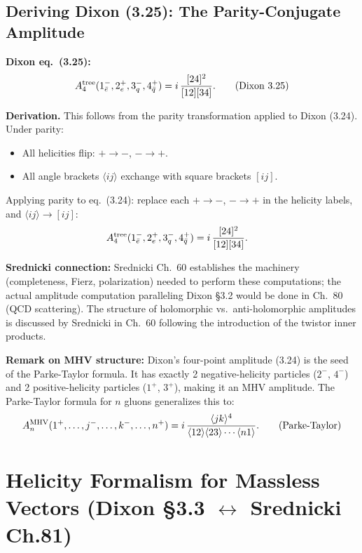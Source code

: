 \subsection{Deriving Dixon (3.25): The Parity-Conjugate Amplitude}

\textbf{Dixon eq.~(3.25):}
\begin{equation}
  A_4^{\rm tree}(1_{\bar{e}}^-, 2_e^+, 3_q^-, 4_{\bar{q}}^+)
  = i\,\frac{[24]^2}{[12][34]}.
  \tag{Dixon 3.25}
\end{equation}

\textbf{Derivation.} This follows from the parity transformation applied to Dixon (3.24).
Under parity:
\begin{itemize}
  \item All helicities flip: $+\to -$, $-\to +$.
  \item All angle brackets $\langle ij\rangle$ exchange with square brackets $[ij]$.
\end{itemize}

Applying parity to eq.~(3.24): replace each $+\to-$, $-\to+$ in the helicity labels,
and $\langle ij\rangle\to[ij]$:
\begin{align}
  A_4^{\rm tree}(1_{\bar{e}}^-, 2_e^+, 3_q^-, 4_{\bar{q}}^+)
  &= i\,\frac{[24]^2}{[12][34]}.
\end{align}

\textbf{Srednicki connection:} Srednicki Ch.~60 establishes the machinery (completeness,
Fierz, polarization) needed to perform these computations; the actual amplitude computation
paralleling Dixon §3.2 would be done in Ch.~80 (QCD scattering). The structure of
holomorphic vs.\ anti-holomorphic amplitudes is discussed by Srednicki in Ch.~60 following
the introduction of the twistor inner products.

\textbf{Remark on MHV structure:} Dixon's four-point amplitude (3.24) is the seed
of the Parke-Taylor formula. It has exactly 2 negative-helicity particles ($2^-$, $4^-$)
and 2 positive-helicity particles ($1^+$, $3^+$), making it an MHV amplitude.
The Parke-Taylor formula for $n$ gluons generalizes this to:
\begin{equation}
  A_n^{\rm MHV}(1^+,\ldots,j^-,\ldots,k^-,\ldots,n^+)
  = i\,\frac{\langle jk\rangle^4}{\langle 12\rangle\langle 23\rangle\cdots\langle n1\rangle}.
  \tag{Parke-Taylor}
\end{equation}


\section{Helicity Formalism for Massless Vectors (Dixon \S3.3 $\leftrightarrow$ Srednicki Ch.81)}
\label{sec:helicity-vectors}

